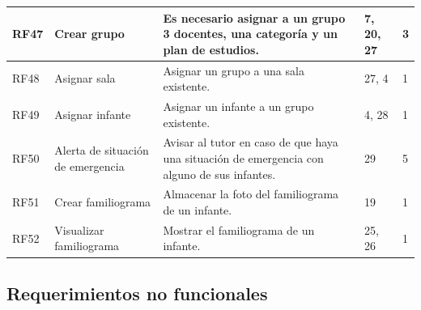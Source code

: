 \documentclass{article}
\begin{document}
\begin{longtable}{|p{1.0cm}|p{3.0cm}|p{5.0cm}|p{1.2cm}|p{0.75cm}|}
	RF47 &
	Crear grupo &
	Es necesario asignar a un grupo 3 docentes, una categoría y un plan de estudios. &
	7, 20, 27 & 
	 3
	\\ \hline

	RF48 &
	Asignar sala &
	Asignar un grupo a una sala existente. &
	27, 4 & 
	 1
	\\ \hline

	RF49 &
	Asignar infante &
	Asignar un infante a un grupo existente. &
	4, 28 & 
	 1
	\\ \hline

	RF50 &
	Alerta de situación de emergencia &
	Avisar al tutor en caso de que haya una situación  de emergencia con alguno de sus infantes. &
	29 & 
	 5
	\\ \hline
	
	RF51 &
	Crear familiograma &
	Almacenar la foto del familiograma de un infante. &
	19 & 
	 1
	\\ \hline

	RF52 &
	Visualizar familiograma &
	Mostrar el familiograma de un infante. &
	25, 26 & 
	 1
	\\ \hline

\end{longtable}


\subsection{Requerimientos no funcionales}
\end{document}
